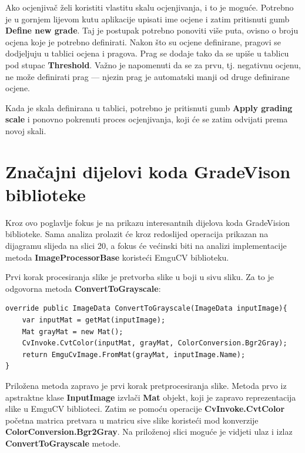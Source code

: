 \documentclass{foi}
\begin{document}
Ako ocjenjivač želi koristiti vlastitu skalu ocjenjivanja, i to je moguće. Potrebno je u gornjem lijevom kutu aplikacije upisati ime ocjene i zatim pritisnuti gumb \textbf{Define new grade}. Taj je postupak potrebno ponoviti više puta, ovisno o broju ocjena koje je potrebno definirati. Nakon što su ocjene definirane, pragovi se dodjeljuju u tablici ocjena i pragova. Prag se dodaje tako da se upiše u tablicu pod stupac \textbf{Threshold}. Važno je napomenuti da se za prvu, tj. negativnu ocjenu, ne može definirati prag — njezin prag je automatski manji od druge definirane ocjene.

Kada je skala definirana u tablici, potrebno je pritisnuti gumb \textbf{Apply grading scale} i ponovno pokrenuti proces ocjenjivanja, koji će se zatim odvijati prema novoj skali.

\section{Značajni dijelovi koda GradeVison biblioteke}

Kroz ovo poglavlje fokus je na prikazu interesantnih dijelova koda GradeVision biblioteke. Sama analiza prolazit će kroz redoslijed operacija prikazan na dijagramu slijeda na slici 20, a fokus će većinski biti na analizi implementacije metoda \textbf{ImageProcessorBase} koristeći EmguCV biblioteku.

Prvi korak procesiranja slike je pretvorba slike u boji u sivu sliku. Za to je odgovorna metoda \textbf{ConvertToGrayscale}:

\begin{lstlisting}[caption={Metoda za konverziju slike u boji u sivu sliku}]
override public ImageData ConvertToGrayscale(ImageData inputImage){
    var inputMat = getMat(inputImage);
    Mat grayMat = new Mat();
    CvInvoke.CvtColor(inputMat, grayMat, ColorConversion.Bgr2Gray);
    return EmguCvImage.FromMat(grayMat, inputImage.Name);
}
\end{lstlisting} 

Priložena metoda zapravo je prvi korak pretprocesiranja slike. Metoda prvo iz apstraktne klase \textbf{InputImage} izvlači \textbf{Mat} objekt, koji je zapravo reprezentacija slike u EmguCV biblioteci. Zatim se pomoću operacije \textbf{CvInvoke.CvtColor} početna matrica pretvara u matricu sive slike koristeći mod konverzije \textbf{ColorConversion.Bgr2Gray}. Na priloženoj slici moguće je vidjeti ulaz i izlaz \textbf{ConvertToGrayscale} metode.
\end{document}
